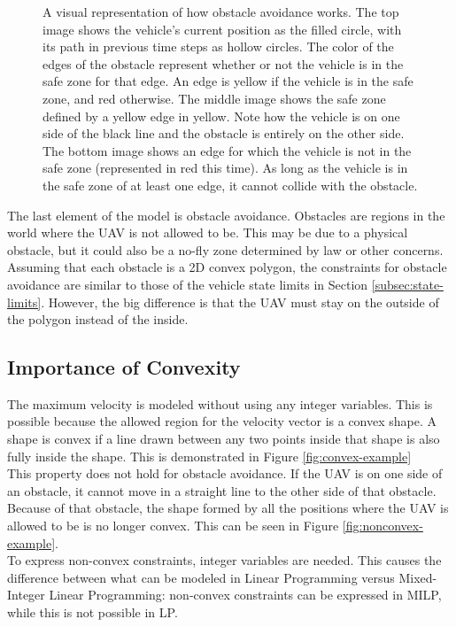 \begin{figure}[!t]
\begin{subfigure}[t]{0.47\textwidth}
        \caption{}
    \end{subfigure}
    \caption[A visual demonstration of obstacle avoidance in the MILP model]{A visual representation of how obstacle avoidance works. The top image shows the vehicle's current position as the filled circle, with its path in previous time steps as hollow circles. The color of the edges of the obstacle represent whether or not the vehicle is in the safe zone for that edge. An edge is yellow if the vehicle is in the safe zone, and red otherwise. The middle image shows the safe zone defined by a yellow edge in yellow. Note how the vehicle is on one side of the black line and the obstacle is entirely on the other side. The bottom image shows an edge for which the vehicle is not in the safe zone (represented in red this time). As long as the vehicle is in the safe zone of at least one edge, it cannot collide with the obstacle.}\label{fig:obs}
\end{figure}
The last element of the model is obstacle avoidance. Obstacles are regions in the world where the UAV is not allowed to be. This may be due to a physical obstacle, but it could also be a no-fly zone determined by law or other concerns. \\
Assuming that each obstacle is a 2D convex polygon, the constraints for obstacle avoidance are similar to those of the vehicle state limits in Section \ref{subsec:state-limits}. However, the big difference is that the UAV must stay on the outside of the polygon instead of the inside. \\
\subsection{Importance of Convexity}
The maximum velocity is modeled without using any integer variables. This is possible because the allowed region for the velocity vector is a convex shape. A shape is convex if a line drawn between any two points inside that shape is also fully inside the shape. This is demonstrated in Figure \ref{fig:convex-example}\\
This property does not hold for obstacle avoidance. If the UAV is on one side of an obstacle, it cannot move in a straight line to the other side of that obstacle. Because of that obstacle, the shape formed by all the positions where the UAV is allowed to be is no longer convex. This can be seen in Figure \ref{fig:nonconvex-example}. \\
To express non-convex constraints, integer variables are needed. This causes the difference between what can be modeled in Linear Programming versus Mixed-Integer Linear Programming: non-convex constraints can be expressed in MILP, while this is not possible in LP.


